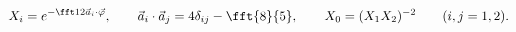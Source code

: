 \begin{equation}
X_i=e^{-\fft12\vec a_i\cdot\vec\varphi},\qquad
\vec a_i\cdot\vec a_j=4\delta_{ij}-\fft{8}{5},\qquad
X_0=(X_1X_2)^{-2} \qquad(i,j=1,2).
\end{equation}

